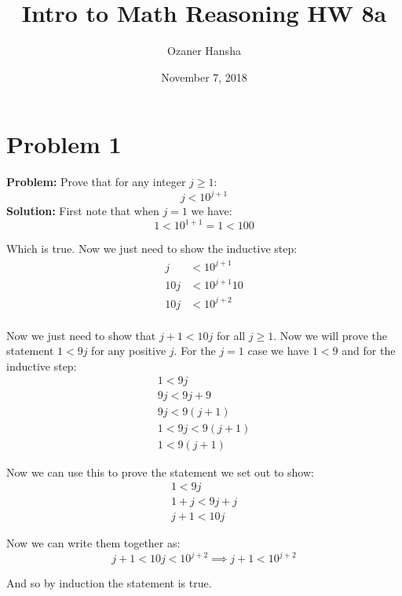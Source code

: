 \documentclass{article}
\begin{document}
\title{Intro to Math Reasoning HW 8a}
\author{Ozaner Hansha}
\date{November 7, 2018}
\maketitle

\section*{Problem 1}
\textbf{Problem:} Prove that for any integer $j\ge 1$:
$$j<10^{j+1}$$
\textbf{Solution:} First note that when $j=1$ we have:
$$1<10^{1+1}=1<100$$

Which is true. Now we just need to show the inductive step:
\begin{align*}
  j&<10^{j+1}\\
  10j&<10^{j+1}10\\
  10j&<10^{j+2}\\
\end{align*}

Now we just need to show that $j+1<10j$ for all $j\ge 1$. Now we will prove the statement $1<9j$ for any positive $j$. For the $j=1$ case we have $1<9$ and for the inductive step:
\begin{align*}
  1<9j\tag{given}\\
  9j<9j+9\\
  9j<9(j+1)\\
  1<9j<9(j+1)\\
  1<9(j+1)
\end{align*}

Now we can use this to prove the statement we set out to show:
\begin{align*}
  1<9j\tag{for any $j\ge1$}\\
  1+j<9j+j\\
  j+1<10j
\end{align*}

Now we can write them together as:
$$j+1<10j<10^{j+2}\implies j+1<10^{j+2}$$

And so by induction the statement is true.

%
\end{document}
